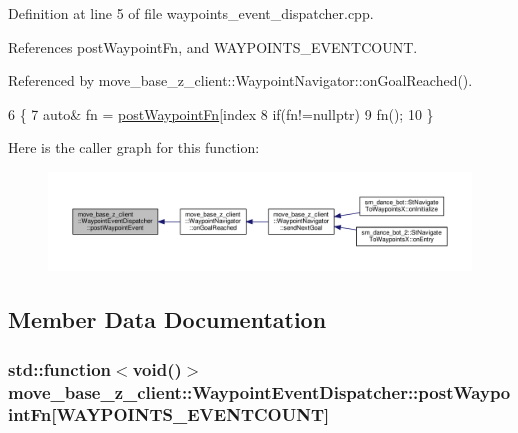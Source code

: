 Definition at line 5 of file waypoints\+\_\+event\+\_\+dispatcher.\+cpp.



References post\+Waypoint\+Fn, and W\+A\+Y\+P\+O\+I\+N\+T\+S\+\_\+\+E\+V\+E\+N\+T\+C\+O\+U\+NT.



Referenced by move\+\_\+base\+\_\+z\+\_\+client\+::\+Waypoint\+Navigator\+::on\+Goal\+Reached().


\begin{DoxyCode}
6 \{
7     \textcolor{keyword}{auto}& fn = \hyperlink{classmove__base__z__client_1_1WaypointEventDispatcher_acc538eb7506c13f7cca2268a1742dadd}{postWaypointFn}[index %
8     \textcolor{keywordflow}{if}(fn!=\textcolor{keyword}{nullptr})
9         fn();
10 \}
\end{DoxyCode}


Here is the caller graph for this function\+:\nopagebreak
\begin{figure}[H]
\begin{center}
\leavevmode
\includegraphics[width=350pt]{classmove__base__z__client_1_1WaypointEventDispatcher_a7421f1eb8aae15a3ddde7c50bea87648_icgraph}
\end{center}
\end{figure}




\subsection{Member Data Documentation}
\subsubsection[{\texorpdfstring{post\+Waypoint\+Fn}{postWaypointFn}}]{\setlength{\rightskip}{0pt plus 5cm}std\+::function$<$void()$>$ move\+\_\+base\+\_\+z\+\_\+client\+::\+Waypoint\+Event\+Dispatcher\+::post\+Waypoint\+Fn\mbox{[}{\bf W\+A\+Y\+P\+O\+I\+N\+T\+S\+\_\+\+E\+V\+E\+N\+T\+C\+O\+U\+NT}\mbox{]}\hspace{0.3cm}{\ttfamily [private]}}\hypertarget{classmove__base__z__client_1_1WaypointEventDispatcher_acc538eb7506c13f7cca2268a1742dadd}{}\label{classmove__base__z__client_1_1WaypointEventDispatcher_acc538eb7506c13f7cca2268a1742dadd}



